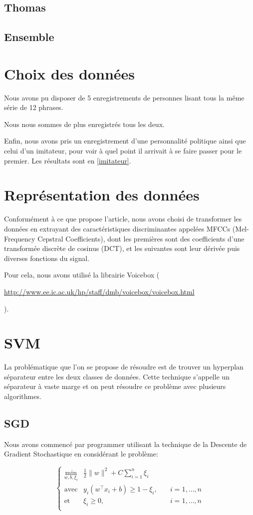 \documentclass{article}
\let\urlorig\url
\renewcommand{\url}[1]{%
  \begin{otherlanguage}{english}\urlorig{#1}\end{otherlanguage}%
}
\begin{document}
\subsection{Thomas}
\subsection{Ensemble}

\section{Choix des données}
Nous avons pu disposer de 5 enregistrements de personnes lisant tous la même série de 12 phrases.

Nous nous sommes de plus enregistrés tous les deux.

Enfin, nous avons pris un enregistrement d'une personnalité politique ainsi que celui d'un imitateur, pour voir à quel point il arrivait à se faire passer pour le premier. Les résultats sont en \ref{imitateur}.
\section{Représentation des données}
\label{representation}
Conformément à ce que propose l'article, nous avons choisi de transformer les données en extrayant des caractéristiques discriminantes appelées MFCCs (Mel-Frequency Cepstral Coefficients), dont les premières sont des coefficients d'une transformée discrète de cosinus (DCT), et les suivantes sont leur dérivée puis diverses fonctions du signal.

Pour cela, nous avons utilisé la librairie Voicebox (\url{http://www.ee.ic.ac.uk/hp/staff/dmb/voicebox/voicebox.html}).
\section{SVM}
\label{svm}
La problématique que l'on se propose de résoudre est de trouver un hyperplan séparateur entre les deux classes de données. Cette technique s'appelle un séparateur à vaste marge et on peut résoudre ce problème avec plusieurs algorithmes.
\subsection{SGD}
\label{sgd}
Nous avons commencé par programmer utilisant la technique de la Descente de Gradient Stochastique en considérant le problème:

\begin{equation}
\label{eq:primalSVM}
  \left\{
    \begin{array} {lll}
      \displaystyle\min_{w,b,\xi_i} & \frac{1}{2} \|w\|^2 + C\displaystyle\sum\limits_{i=1}^{n}\xi_i&\\
      \mbox{avec} &y_i(w^\top  x_i+b) \geq 1 - \xi_i,\quad & i=1,\dots ,n  \\
      \mbox{et} &\xi_i \geq 0 , &i=1,\dots ,n  \\
    \end{array}
  \right.
\end{equation}
\end{document}
